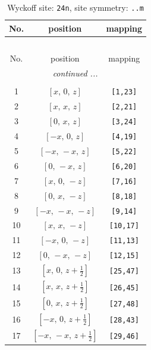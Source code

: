 \documentclass[fleqn,8pt]{jsarticle}
\begin{document}
\begin{longtable}{ccc}
\caption{Wyckoff site: {\tt 24n}, site symmetry: {\tt ..m}}
 \\
 \hline \hline
No. & position & mapping \\ \hline \endfirsthead

\multicolumn{2}{l}{\tablename\ \thetable{}} \\
 \hline \hline
No. & position & mapping \\ \hline \endhead

 \hline \hline
\multicolumn{2}{r}{\footnotesize\it continued ...} \\ \endfoot

 \hline \hline
\multicolumn{2}{r}{} \\ \endlastfoot

1 & $\left[ x,\, 0,\, z \right]$ & {\tt [1,23]} \\ \hline
2 & $\left[ x,\, x,\, z \right]$ & {\tt [2,21]} \\ \hline
3 & $\left[ 0,\, x,\, z \right]$ & {\tt [3,24]} \\ \hline
4 & $\left[ - x,\, 0,\, z \right]$ & {\tt [4,19]} \\ \hline
5 & $\left[ - x,\, - x,\, z \right]$ & {\tt [5,22]} \\ \hline
6 & $\left[ 0,\, - x,\, z \right]$ & {\tt [6,20]} \\ \hline
7 & $\left[ x,\, 0,\, - z \right]$ & {\tt [7,16]} \\ \hline
8 & $\left[ 0,\, x,\, - z \right]$ & {\tt [8,18]} \\ \hline
9 & $\left[ - x,\, - x,\, - z \right]$ & {\tt [9,14]} \\ \hline
10 & $\left[ x,\, x,\, - z \right]$ & {\tt [10,17]} \\ \hline
11 & $\left[ - x,\, 0,\, - z \right]$ & {\tt [11,13]} \\ \hline
12 & $\left[ 0,\, - x,\, - z \right]$ & {\tt [12,15]} \\ \hline
13 & $\left[ x,\, 0,\, z + \frac{1}{2} \right]$ & {\tt [25,47]} \\ \hline
14 & $\left[ x,\, x,\, z + \frac{1}{2} \right]$ & {\tt [26,45]} \\ \hline
15 & $\left[ 0,\, x,\, z + \frac{1}{2} \right]$ & {\tt [27,48]} \\ \hline
16 & $\left[ - x,\, 0,\, z + \frac{1}{2} \right]$ & {\tt [28,43]} \\ \hline
17 & $\left[ - x,\, - x,\, z + \frac{1}{2} \right]$ & {\tt [29,46]} \\ \hline

\end{longtable}
\end{document}
